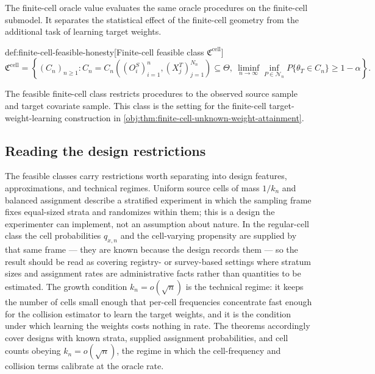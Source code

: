 \documentclass[11pt]{article}
\begin{document}
The finite-cell oracle value  evaluates the same oracle procedures on the finite-cell submodel. It separates the statistical effect of the finite-cell geometry from the additional task of learning target weights.

\begin{definitionv}{def:finite-cell-feasible-honesty}[Finite-cell feasible class $\mathfrak C^{\mathrm{cell}}$]
\[
\mathfrak C^{\mathrm{cell}}
=
\left\{
(C_n)_{n\ge 1} :
C_n
=
C_n\!\left((O_i^S)_{i=1}^n,(X_j^T)_{j=1}^{N_n}\right)
\subseteq \Theta,\ 
\liminf_{n\to\infty}\inf_{P\in\mathcal N_n}
P\{\theta_T\in C_n\}
\ge 1-\alpha
\right\}.
\]
\end{definitionv}

The feasible finite-cell class  restricts procedures to the observed source sample and target covariate sample. This class is the setting for the finite-cell target-weight-learning construction in \cref{obj:thm:finite-cell-unknown-weight-attainment}.

\subsection{Reading the design restrictions}

The feasible classes carry restrictions worth separating into design features, approximations, and
technical regimes. Uniform source cells of mass \(1/k_n\) and balanced assignment describe a stratified
experiment in which the sampling frame fixes equal-sized strata and randomizes within them; this is a
design the experimenter can implement, not an assumption about nature. In the regular-cell class the
cell probabilities \(q_{x,n}\) and the cell-varying propensity are supplied by that same frame — they
are known because the design records them — so the result should be read as covering registry- or
survey-based settings where stratum sizes and assignment rates are administrative facts rather than
quantities to be estimated. The growth condition \(k_n=o(\sqrt n)\) is the technical regime: it keeps
the number of cells small enough that per-cell frequencies concentrate fast enough for the collision
estimator to learn the target weights, and it is the condition under which learning the weights costs
nothing in rate. The theorems accordingly cover designs with known strata, supplied assignment probabilities, and cell counts obeying \(k_n=o(\sqrt n)\), the regime in which the cell-frequency and collision terms calibrate at the oracle rate.
\end{document}
